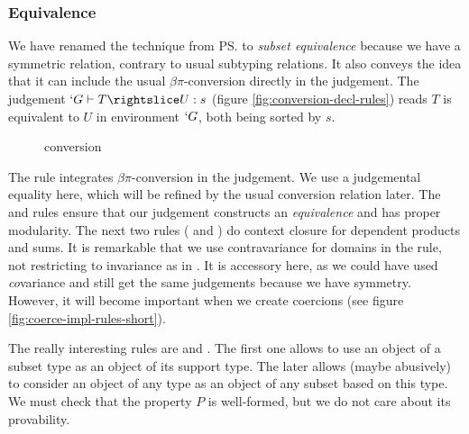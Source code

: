 \documentclass{llncs}
\begin{document}
\subsubsection{Equivalence}
We have renamed the technique from \ps{} to 
\emph{subset equivalence} because we have a symmetric relation, contrary
to usual subtyping relations. It also conveys the idea that it can
include the usual $\beta\pi$-conversion directly in the judgement.
The judgement $`G \typed T \subd{} U : s$ (figure
\vref{fig:conversion-decl-rules}) reads $T$ is equivalent to $U$ in
environment $`G$, both being sorted by $s$. 

\begin{figure}[h]
  \vspace{-2em}
  \subtdRules
  \vspace{-2em}
  \caption{\Russell{} conversion}
  \label{fig:conversion-decl-rules}
  \vspace{-1em}
\end{figure}

The rule  integrates $\beta\pi$-conversion in the
judgement. We use a judgemental equality here, which will be refined by
the usual conversion relation later. The  and
 rules ensure that our judgement constructs an \emph{equivalence} and has
proper modularity. The next two rules ( and
) do context closure for dependent
products and sums. It is remarkable that we use contravariance for
domains in the  rule, not restricting to invariance as in
\PVS. It is accessory here, as we could have used \emph{co}variance and
still get the same judgements because we have symmetry. However, it will
become important when we create coercions (see figure
\vref{fig:coerce-impl-rules-short}).

The really interesting rules are  and
. The first one allows to use an object of a subset type
as an object of its support type. The later allows (maybe abusively) to
consider an object of any type as an object of any subset based on
this type. We must check that the property $P$ is well-formed, but
we do not care about its provability.
\end{document}

